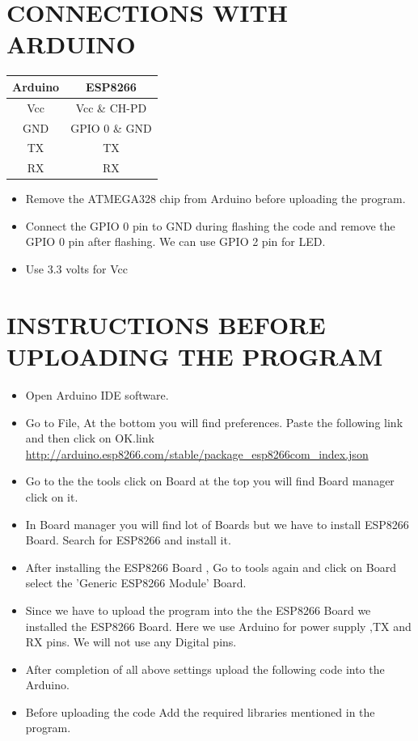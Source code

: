 \documentclass[journal,12pt,twocolumn]{IEEEtran}
\begin{document}
\section{CONNECTIONS WITH ARDUINO}
\begin{center}
\begin{tabular}{ |c|c| } 
\hline
Arduino & ESP8266       \\
\hline
Vcc & Vcc \& CH-PD    \\
\hline
GND   & GPIO 0 \& GND   \\
\hline
TX  & TX        \\
\hline
RX  & RX    \\
\hline
\end{tabular}
\end{center}
\begin{itemize}
\item Remove the ATMEGA328 chip from Arduino before uploading the program.
\item Connect the GPIO 0 pin to GND during flashing the code and remove the GPIO 0 pin after flashing. We can use GPIO 2 pin for LED.
\item Use 3.3 volts for Vcc
\end{itemize}
\section{INSTRUCTIONS BEFORE UPLOADING THE PROGRAM}
\begin{itemize}
\item Open Arduino IDE software.
\item Go to File, At the bottom you will find preferences. Paste the following link and then click on OK.link 
\url{http://arduino.esp8266.com/stable/package_esp8266com_index.json}
\item Go to the the tools click on Board at the top you will find Board manager click on it.
\item In Board manager you will find lot of Boards but we have to install ESP8266 Board. Search for ESP8266 and install it.
\item After installing the ESP8266 Board , Go to tools again and click on Board select the 'Generic ESP8266 Module' Board.
\item Since we have to upload the program into the the ESP8266 Board we installed the ESP8266 Board. Here we use Arduino for power supply ,TX and RX pins. We will not use any Digital pins.
\item After completion of all above settings upload the following code into the Arduino.
\item Before uploading the code Add the required libraries mentioned in the program. 
\end{itemize}
\end{document}
